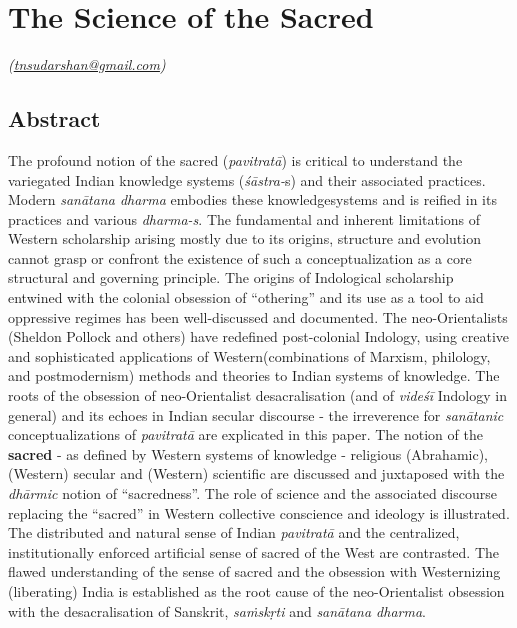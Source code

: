 
\chapter{The Science of the Sacred}\label{chapter5}


\vskip -3pt

\hfill{\sl(\url{tnsudarshan@gmail.com})}

\section*{Abstract}

The profound notion of the sacred (\textit{pavitratā}) is critical to understand the variegated Indian knowledge systems (\textit{śāstra-}s) and their associated practices. Modern \textit{sanātana dharma } embodies these knowledge\break systems and is reified in its practices and various \textit{dharma-s}. The fundamental and inherent limitations of Western scholarship arising mostly due to its origins, structure and evolution cannot grasp or confront the existence of such a conceptualization as a core structural and governing principle. The origins of Indological scholarship entwined with the colonial obsession of “othering” and its use as a tool to aid oppressive regimes has been well-discussed and documented. The neo-Orientalists (Sheldon Pollock and others) have redefined post-colonial Indology, using creative and sophisticated applications of Western\break (combinations of Marxism, philology, and postmodernism) methods and theories to Indian systems of knowledge. The roots of the obsession of neo-Orientalist desacralisation (and of \textit{videśī} Indology in general) and its echoes in Indian secular discourse - the irreverence for \textit{sanātanic} conceptualizations of \textit{pavitratā} are explicated in this paper. The notion of the \textbf{sacred} - as defined by Western systems of knowledge - religious (Abrahamic), (Western) secular and (Western) scientific are discussed and juxtaposed with the \textit{dhārmic} notion of “sacredness”. The role of science and the associated discourse replacing the “sacred” in Western collective conscience and ideology is illustrated. The distributed and natural sense of Indian \textit{pavitratā} and the centralized, institutionally enforced artificial sense of sacred of the West are contrasted. The flawed understanding of the sense of sacred and the obsession with Westernizing (liberating) India is established as the root cause of the neo-Orientalist obsession with the desacralisation of Sanskrit, \textit{saṁskṛti} and \textit{sanātana dharma}.

